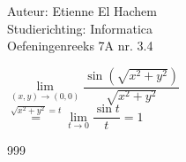 \documentclass[a4paper]{article}
\begin{document}
  
\noindent \large Auteur: Etienne El Hachem \\
\noindent \large Studierichting: Informatica\\
\noindent \large Oefeningenreeks 7A nr. 3.4\\

\medskip

\normalsize

$ \lim\limits_{(x,y)\rightarrow (0,0)}\dfrac{\sin\left(\sqrt{x^2+y^2}\right)}{\sqrt{x^2+y^2}} $\\

$ \stackrel{\sqrt{x^2+y^2} = t}{=} \lim\limits_{t\rightarrow 0}\dfrac{\sin t}{t} = 1 $\\

\begin{thebibliography}{999}
\end{thebibliography}
\end{document}
